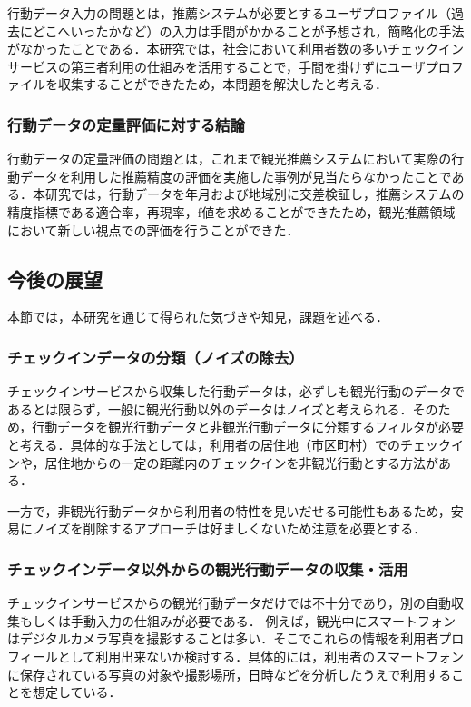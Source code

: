 \documentclass{jsarticle}
\begin{document}
行動データ入力の問題とは，推薦システムが必要とするユーザプロファイル（過去にどこへいったかなど）の入力は手間がかかることが予想され，簡略化の手法がなかったことである．本研究では，社会において利用者数の多いチェックインサービスの第三者利用の仕組みを活用することで，手間を掛けずにユーザプロファイルを収集することができたため，本問題を解決したと考える．

\subsubsection{行動データの定量評価に対する結論}
行動データの定量評価の問題とは，これまで観光推薦システムにおいて実際の行動データを利用した推薦精度の評価を実施した事例が見当たらなかったことである．本研究では，行動データを年月および地域別に交差検証し，推薦システムの精度指標である適合率，再現率，f値を求めることができたため，観光推薦領域において新しい視点での評価を行うことができた．

\subsection{今後の展望}

本節では，本研究を通じて得られた気づきや知見，課題を述べる．

\subsubsection{チェックインデータの分類（ノイズの除去）}

チェックインサービスから収集した行動データは，必ずしも観光行動のデータであるとは限らず，一般に観光行動以外のデータはノイズと考えられる．そのため，行動データを観光行動データと非観光行動データに分類するフィルタが必要と考える．具体的な手法としては，利用者の居住地（市区町村）でのチェックインや，居住地からの一定の距離内のチェックインを非観光行動とする方法がある．

一方で，非観光行動データから利用者の特性を見いだせる可能性もあるため，安易にノイズを削除するアプローチは好ましくないため注意を必要とする．

\subsubsection{チェックインデータ以外からの観光行動データの収集・活用}

チェックインサービスからの観光行動データだけでは不十分であり，別の自動収集もしくは手動入力の仕組みが必要である．
例えば，観光中にスマートフォンはデジタルカメラ写真を撮影することは多い．そこでこれらの情報を利用者プロフィールとして利用出来ないか検討する．具体的には，利用者のスマートフォンに保存されている写真の対象や撮影場所，日時などを分析したうえで利用することを想定している．
\end{document}
